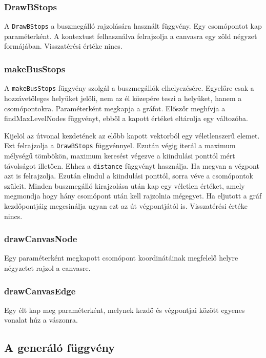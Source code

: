 \subsubsection{DrawBStops}

A \texttt{DrawBStops} a buszmegálló rajzolására használt függvény. Egy csomópontot kap paraméterként. A kontextust felhasználva felrajzolja a canvasra egy zöld négyzet formájában. Visszatérési értéke nincs.

\subsubsection{makeBusStops}

A \texttt{makeBusStops} függvény szolgál a buszmegállók elhelyezésére. Egyelőre csak a hozzávetőleges helyüket jelöli, nem az él közepére teszi a helyüket, hanem a csomópontokra. Paraméterként megkapja a gráfot. Előszőr meghívja a findMaxLevelNodes függvényt, ebből a kapott értéket eltárolja egy változóba. 

Kijelöl az útvonal kezdetének az előbb kapott vektorból egy véletlenszerű elemet. Ezt felrajzolja a \texttt{DrawBStops} függvénnyel. Ezután végig iterál a maximum mélységű tömbökön, maximum keresést végezve a kiindulási ponttól mért távolságot illetően. Ehhez a \texttt{distance} függvényt használja. Ha megvan a végpont azt is felrajzolja. 
Ezután elindul a kiindulási ponttól, sorra véve a csomópontok szüleit. Minden buszmegálló kirajzolása után kap egy véletlen értéket, amely megmondja hogy hány csomópont után kell rajzolnia mégegyet. Ha eljutott a gráf kezdőpontjáig megcsinálja ugyan ezt az út végpontjától is. Visszatérési értéke nincs.

\subsubsection{drawCanvasNode}

Egy paraméterként megkapott csomópont koordinátáinak megfelelő helyre négyzetet rajzol a canvasre.

\subsubsection{drawCanvasEdge}

Egy élt kap meg paraméterként, melynek kezdő és végpontjai között egyenes vonalat húz a vászonra.

\subsection{A generáló függvény}


